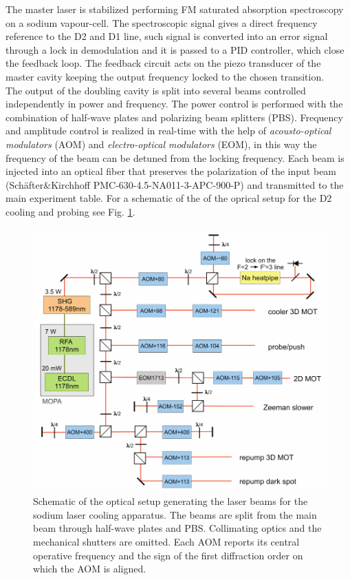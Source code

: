 \documentclass[../thesis.tex]{subfiles}
\begin{document}
The master laser is stabilized performing FM saturated absorption spectroscopy on a sodium vapour-cell. The spectroscopic signal gives a direct frequency reference to the D2 and D1 line, such signal is converted into an error signal through a lock in demodulation and it is passed to a PID controller, which close the feedback loop. The feedback circuit acts on the piezo transducer of the master cavity keeping the output frequency locked to the chosen transition.\\
The output of the doubling cavity is split into several beams controlled independently in power and frequency. The power control is performed with the combination of half-wave plates and polarizing beam splitters (PBS). Frequency and amplitude control is realized in real-time with the help of \textit{acousto-optical modulators} (AOM) and \textit{electro-optical modulators} (EOM), in this way the frequency of the beam can be detuned from the locking frequency. Each beam is injected into an optical fiber that preserves the polarization of the input beam (Schäfter\&Kirchhoff PMC-630-4.5-NA011-3-APC-900-P) and transmitted to the main experiment table. For a schematic of the of the oprical setup for the D2 cooling and probing see Fig. \ref{fig:d2_table}.\\

\begin{figure}[!htb]
\centering
\includegraphics[scale=1]{d2_schematic.pdf}
\caption{Schematic of the optical setup generating the laser beams for the sodium laser cooling apparatus. The beams are split from the main beam through half-wave plates and PBS. Collimating optics and the mechanical shutters are omitted. Each AOM reports its central operative frequency and the sign of the first diffraction order on which the AOM is aligned.}
\label{fig:d2_table}
\end{figure}
\end{document}
